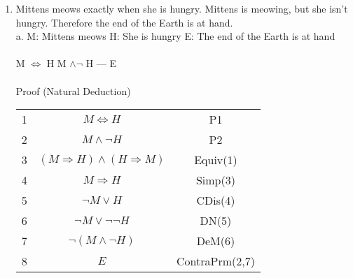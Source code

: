 \documentclass[]{article}
\begin{document}
\begin{enumerate}
    \item Mittens meows exactly when she is hungry. Mittens is meowing, but she isn't hungry. Therefore the end of the Earth is at hand. 
    \\a.
    \newline M: Mittens meows
    \newline H: She is hungry
    \newline E: The end of the Earth is at hand 
    \\\\ M $\iff$ H
    \newline M $\land \neg$ H
    \newline ---
    \newline E
    \\\\ Proof (Natural Deduction)
    \begin{tabular}{c| c | c}
        1 & $M \iff H$ & P1 \\
        2 & $M \land \neg H$ & P2 \\
        3 & $(M \Rightarrow H)\land(H \Rightarrow M)$ & Equiv(1) \\
        4 & $M \Rightarrow H$ & Simp(3) \\
        5 & $\neg M \lor H$ & CDis(4) \\
        6 & $\neg M \lor \neg \neg H$ & DN(5) \\
        7 & $\neg (M \land \neg H)$ & DeM(6) \\
        8 & $E$ & ContraPrm(2,7) \\
    \end{tabular}
    

\end{enumerate}
\end{document}
